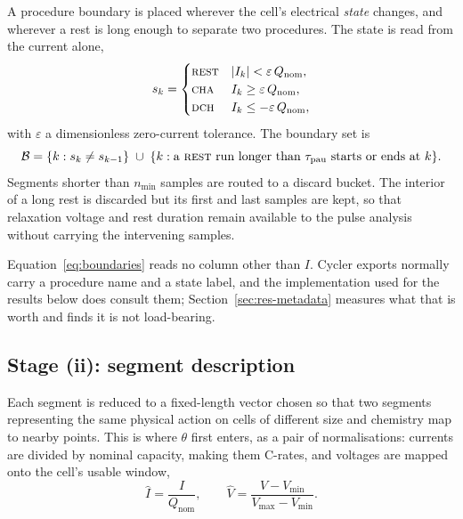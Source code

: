 \documentclass[preprint,3p,number]{elsarticle}
\begin{document}
A procedure boundary is placed wherever the cell's electrical \emph{state}
changes, and wherever a rest is long enough to separate two procedures. The
state is read from the current alone,
\begin{equation}
s_k =
\begin{cases}
\textsc{rest} & |I_k| < \varepsilon\,Q_{\mathrm{nom}},\\
\textsc{cha}  & I_k \ge \varepsilon\,Q_{\mathrm{nom}},\\
\textsc{dch}  & I_k \le -\varepsilon\,Q_{\mathrm{nom}},
\end{cases}
\label{eq:state}
\end{equation}
with $\varepsilon$ a dimensionless zero-current tolerance. The boundary set is
\begin{equation}
\mathcal{B} = \{k : s_k \neq s_{k-1}\} \;\cup\;
              \{k : \text{a \textsc{rest} run longer than }
                    \tau_{\mathrm{pau}}\text{ starts or ends at } k\}.
\label{eq:boundaries}
\end{equation}
Segments shorter than $n_{\min}$ samples are routed to a discard bucket. The
interior of a long rest is discarded but its first and last samples are kept, so
that relaxation voltage and rest duration remain available to the pulse
analysis without carrying the intervening samples.

Equation~\eqref{eq:boundaries} reads no column other than $I$. Cycler exports
normally carry a procedure name and a state label, and the implementation used
for the results below does consult them; Section~\ref{sec:res-metadata} measures
what that is worth and finds it is not load-bearing.

\subsection{Stage (ii): segment description}
\label{sec:features}

Each segment is reduced to a fixed-length vector chosen so that two segments
representing the same physical action on cells of different size and chemistry
map to nearby points. This is where $\theta$ first enters, as a pair of
normalisations: currents are divided by nominal capacity, making them C-rates,
and voltages are mapped onto the cell's usable window,
\begin{equation}
\hat{I} = \frac{I}{Q_{\mathrm{nom}}},
\qquad
\hat{V} = \frac{V - V_{\min}}{V_{\max} - V_{\min}}.
\label{eq:norm}
\end{equation}
\end{document}

